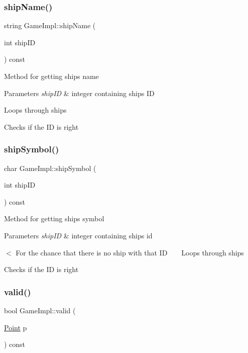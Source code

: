 \subsubsection{\texorpdfstring{ship\+Name()}{shipName()}}
{\footnotesize\ttfamily string Game\+Impl\+::ship\+Name (\begin{DoxyParamCaption}\item[{int}]{ship\+ID }\end{DoxyParamCaption}) const}

Method for getting ship\textquotesingle{}s name 
\begin{DoxyParams}{Parameters}
{\em ship\+ID} & integer containing ship\textquotesingle{}s ID \\
\hline
\end{DoxyParams}
Loops through ships

Checks if the ID is right \mbox{\label{class_game_impl_a1138859824715420317de50ffb15fdb9}} 
\subsubsection{\texorpdfstring{ship\+Symbol()}{shipSymbol()}}
{\footnotesize\ttfamily char Game\+Impl\+::ship\+Symbol (\begin{DoxyParamCaption}\item[{int}]{ship\+ID }\end{DoxyParamCaption}) const}

Method for getting ship\textquotesingle{}s symbol 
\begin{DoxyParams}{Parameters}
{\em ship\+ID} & integer containing ship\textquotesingle{}s id \\
\hline
\end{DoxyParams}
$<$ For the chance that there is no ship with that ID ~\newline
~\newline
 Loops through ships

Checks if the ID is right \mbox{\label{class_game_impl_adae52d5fa830b6f0f0585e24cde3af3b}} 
\subsubsection{\texorpdfstring{valid()}{valid()}}
{\footnotesize\ttfamily bool Game\+Impl\+::valid (\begin{DoxyParamCaption}\item[{\mbox{\hyperlink{class_point}{Point}}}]{p }\end{DoxyParamCaption}) const}

